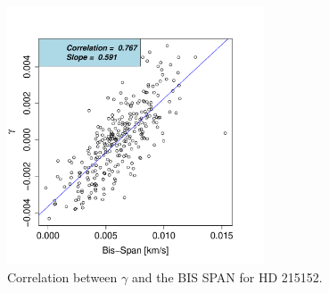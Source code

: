 \documentclass[11pt, oneside]{article}
\begin{document}
\begin{figure}[htbp]
   \centering
\includegraphics[height = 3in]{HD21515_[2]gamma_vs_bisspan.pdf} 
   \caption{Correlation between $\gamma$ and the BIS SPAN for HD 215152.}
   \label{fig:HD215152:corr.gamma}
\end{figure}
\end{document}
